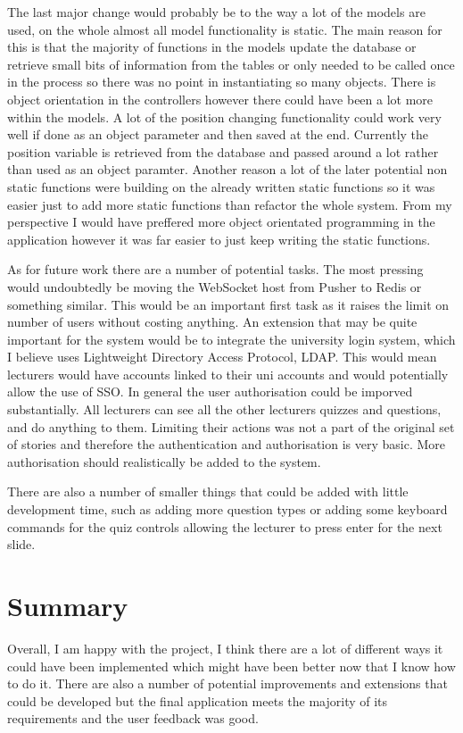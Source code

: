 The last major change would probably be to the way a lot of the models are used, on the whole almost all model functionality is static. The main reason for this is that the majority of functions in the models update the database or retrieve small bits of information from the tables or only needed to be called once in the process so there was no point in instantiating so many objects. There is object orientation in the controllers however there could have been a lot more within the models. A lot of the position changing functionality could work very well if done as an object parameter and then saved at the end. Currently the position variable is retrieved from the database and passed around a lot rather than used as an object paramter. Another reason a lot of the later potential non static functions were building on the already written static functions so it was easier just to add more static functions than refactor the whole system. From my perspective I would have preffered more object orientated programming in the application however it was far easier to just keep writing the static functions.

As for future work there are a number of potential tasks. The most pressing would undoubtedly be moving the WebSocket host from Pusher to Redis or something similar. This would be an important first task as it raises the limit on number of users without costing anything. An extension that may be quite important for the system would be to integrate the university login system, which I believe uses Lightweight Directory Access Protocol, LDAP. This would mean lecturers would have accounts linked to their uni accounts and would potentially allow the use of SSO. In general the user authorisation could be imporved substantially. All lecturers can see all the other lecturers quizzes and questions, and do anything to them. Limiting their actions was not a part of the original set of stories and therefore the authentication and authorisation is very basic. More authorisation should realistically be added to the system.

There are also a number of smaller things that could be added with little development time, such as adding more question types or adding some keyboard commands for the quiz controls allowing the lecturer to press enter for the next slide.

\section{Summary}
Overall, I am happy with the project, I think there are a lot of different ways it could have been implemented which might have been better now that I know how to do it. There are also a number of potential improvements and extensions that could be developed but the final application meets the majority of its requirements and the user feedback was good.